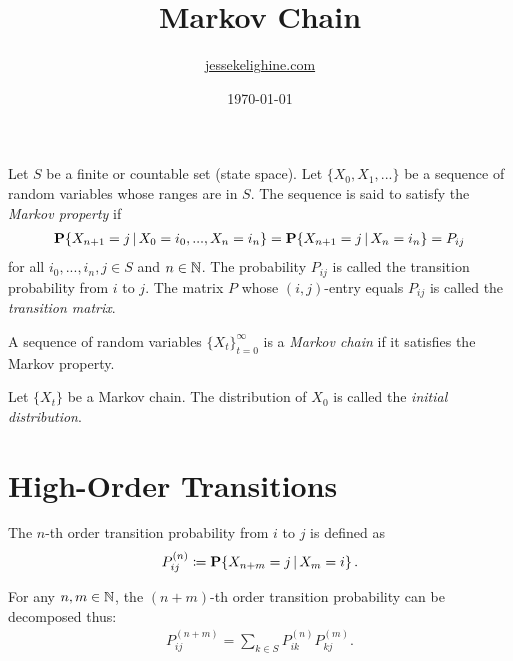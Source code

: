 \documentclass[a4paper,12pt]{article}
\title{Markov Chain}
\author{\href{https://jessekelighine.com}{jessekelighine.com}}
\date{\today}
\begin{document}
\maketitle

\begin{definition}
	Let $S$ be a finite or countable set (state space).
	Let $\{X_{0},X_{1},...\}$ be a sequence of random variables whose ranges are in $S$.
	The sequence is said to satisfy the \emph{Markov property} if
	\begin{align*}
		\operatorname{\text{\upshape\textbf{P}}}\!\left\{X_{n+1}=j\,|\, X_0=i_{0},...,X_n=i_{n}\right\} =
		\operatorname{\text{\upshape\textbf{P}}}\!\left\{X_{n+1}=j\,|\, X_n=i_{n}\right\} =
		P_{ij}
	\end{align*}
	for all $i_{0},...,i_{n},j\in S$ and $n\in\mathbb{N}$.
	The probability $P_{ij}$ is called the transition probability from $i$ to $j$.
	The matrix $P$ whose $(i,j)$-entry equals $P_{ij}$ is called the \emph{transition matrix}.
\end{definition}

\begin{definition}
	A sequence of random variables $\{X_{t}\}_{t=0}^{\infty}$ is a \emph{Markov chain}
	if it satisfies the Markov property.
\end{definition}

\begin{definition}
	Let $\{X_{t}\}$ be a Markov chain. 
	The distribution of $X_{0}$ is called the \emph{initial distribution}.
\end{definition}

\section{High-Order Transitions}

\begin{definition}
	The $n$-th order transition probability from $i$ to $j$ is defined as
	\begin{align*}
		P_{ij}^{(n)}
		\coloneqq
		\operatorname{\text{\upshape\textbf{P}}}\!\left\{X_{n+m}=j\,|\, X_{m}=i\right\}.
	\end{align*}
\end{definition}

\begin{theorem}
	For any $n,m\in\mathbb{N}$,
	the $(n+m)$-th order transition probability can be decomposed thus:
	\begin{align*}
		P_{ij}^{(n+m)} = \sum_{k\in S} P_{ik}^{(n)}P_{kj}^{(m)}.
	\end{align*}
\end{theorem}
\end{document}
